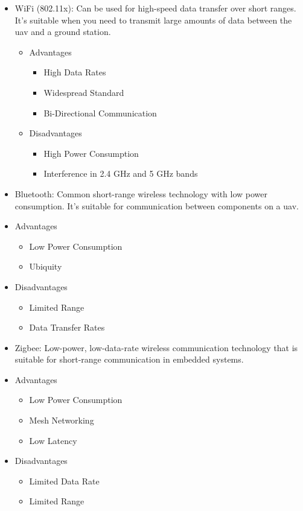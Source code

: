 \begin{itemize}
    \item WiFi (802.11x): Can be used for high-speed data transfer over short ranges. It's suitable when you need to transmit large amounts of data between the \gls{uav} and a ground station.
          \begin{itemize}
              \item Advantages
                    \begin{itemize}
                        \item High Data Rates
                        \item Widespread Standard
                        \item Bi-Directional Communication
                    \end{itemize}
              \item Disadvantages
                    \begin{itemize}
                        \item High Power Consumption
                        \item Interference in 2.4 GHz and 5 GHz bands
                    \end{itemize}
          \end{itemize}

    \item Bluetooth: Common short-range wireless technology with low power consumption. It's suitable for communication between components on a \gls{uav}.
    \item Advantages
          \begin{itemize}
              \item Low Power Consumption
              \item Ubiquity
          \end{itemize}
    \item Disadvantages
          \begin{itemize}
              \item Limited Range
              \item Data Transfer Rates
          \end{itemize}

    \item Zigbee: Low-power, low-data-rate wireless communication technology that is suitable for short-range communication in embedded systems.
    \item Advantages
          \begin{itemize}
              \item Low Power Consumption
              \item Mesh Networking
              \item Low Latency
          \end{itemize}
    \item Disadvantages
          \begin{itemize}
              \item Limited Data Rate
              \item Limited Range
          \end{itemize}


\end{itemize}
